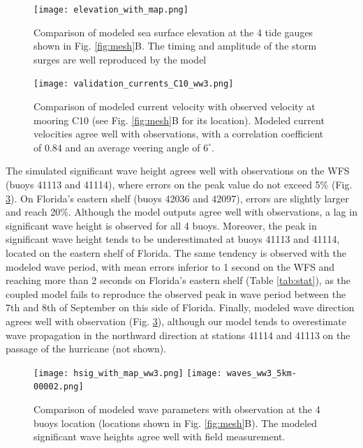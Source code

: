 \documentclass[preprint,12pt,authoryear]{elsarticle}
\begin{document}
\begin{figure}
    \centering
    \texttt{[image: elevation\_with\_map.png]}
    \caption{Comparison of modeled sea surface elevation at the 4 tide gauges shown in Fig. \ref{fig:mesh}B. The timing and amplitude of the storm surges are well reproduced by the model}
    \label{fig:sse}
\end{figure}
\begin{figure}
    \texttt{[image: validation\_currents\_C10\_ww3.png]}
    \caption{Comparison of modeled current velocity with observed velocity at mooring C10 (see Fig. \ref{fig:mesh}B for its location). Modeled current velocities agree well with observations, with a correlation coefficient of 0.84 and an average veering angle of $6^\circ$.}
    \label{fig:uv}
\end{figure}

The simulated significant wave height agrees well with observations on the WFS (buoys 41113 and 41114), where errors on the peak value do not exceed 5\% (Fig. \ref{fig:waves}). On Florida's eastern shelf (buoys 42036 and 42097), errors are slightly larger and reach 20\%. Although the model outputs agree well with observations, a lag in significant wave height is observed for all 4 buoys. Moreover, the peak in significant wave height tends to be underestimated at buoys 41113 and 41114, located on the eastern shelf of Florida. The same tendency is observed with the modeled wave period, with mean errors inferior to 1 second on the WFS and reaching more than 2 seconds on Florida's eastern shelf (Table \ref{tab:stat}), as the coupled model fails to reproduce the observed peak in wave period between the 7th and 8th of September on this side of Florida. Finally, modeled wave direction agrees well with observation (Fig. \ref{fig:waves}), although our model tends to overestimate wave propagation in the northward direction at stations 41114 and 41113 on the passage of the hurricane (not shown).

\begin{figure}
    \centering
    \texttt{[image: hsig\_with\_map\_ww3.png]}
    \texttt{[image: waves\_ww3\_5km-00002.png]}
    \caption{Comparison of modeled wave parameters with observation at the 4 buoys location (locations shown in Fig. \ref{fig:mesh}B). The modeled significant wave heights agree well with field measurement. }
    \label{fig:waves}
\end{figure}
\end{document}
